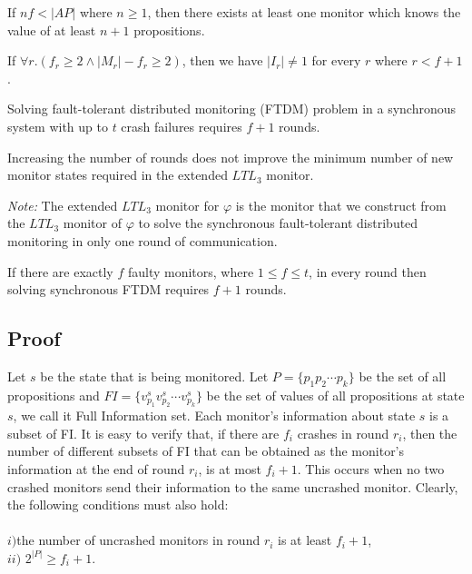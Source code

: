 \begin{lemma}
If $nf<|AP|$ where $n\geq 1$, then there exists at least one monitor which knows the value of at least $n+1$ propositions.
\end{lemma}


\begin{lemma}
If $\forall r. (f_r\geq 2  \wedge  |M_r|-f_r\geq 2)$, then we have $|I_r|\neq1$ for every $r$ where $r < f +1$.
\end{lemma}


\begin{lemma}
Solving fault-tolerant distributed monitoring (FTDM) problem in a synchronous system with up to $t$ crash failures requires $f+1$ rounds.
\end{lemma}

\begin{lemma}
Increasing the number of rounds does not improve the minimum number of new monitor states required in the extended $LTL_3$ monitor.
\end{lemma}

\textit{Note:} The extended $LTL_3$ monitor for $\varphi$ is the monitor that we construct from the $LTL_3$ monitor of $\varphi$ to solve the synchronous fault-tolerant distributed monitoring in only one round of communication.


\begin{lemma}

If there are exactly $f$ faulty monitors, where $1 \leq f \leq t$, in every round then solving synchronous FTDM requires $f + 1$ rounds.

\end{lemma}



\subsection*{Proof}

Let $s$ be the state that is being monitored. Let $P = \{p_1 p_2 \cdots p_k\}$ be the set of all propositions and $FI = \{v^s_{p_1} v^s_{p_2} \cdots v^s_{p_k}\}$ be the set of values of all propositions at state $s$, we call it Full Information set. Each monitor's information about state $s$ is a subset of FI. It is easy to verify that, if there are $f_i$ crashes in round $r_i$, then the number of different subsets of FI that can be obtained as the monitor's information at the end of round $r_i$, is at most $f_i+1$. This occurs when no two crashed monitors send their information to the same uncrashed monitor. Clearly, the following conditions must also hold: \\ \\
$i)$the number of uncrashed monitors in round $r_i$ is at least $f_i+1$,   \\ 
$ii)$ $2^{|P|} \geq f_i+1$. 
\\ 

